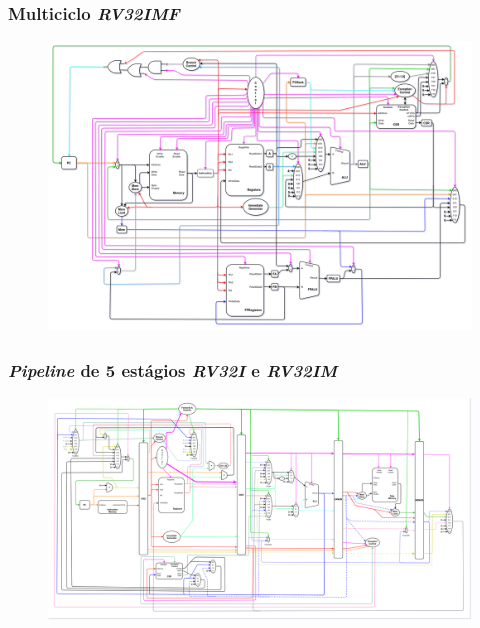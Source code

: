 \documentclass[aspectratio=169]{beamer}
\begin{document}
    \begin{frame}
        \frametitle{Multiciclo \textit{RV32IMF}}
        \vfill
        \begin{figure}[H]
        \centering
            \includegraphics[width=.9\textwidth,height=.85\textheight,keepaspectratio]{../images/uarch_diagrams/multicycle-RV32IMF.png}
        \end{figure}
        \vfill
    \end{frame}

    \begin{frame}
        \frametitle{\textit{Pipeline} de 5 estágios \textit{RV32I} e \textit{RV32IM}}
        \vfill
        \begin{figure}[H]
        \centering
            \includegraphics[width=.99\textwidth,height=.85\textheight,keepaspectratio]{../images/uarch_diagrams/pipeline-RV32I-RV32IM.png}
        \end{figure}
        \vfill
    \end{frame}
\end{document}
